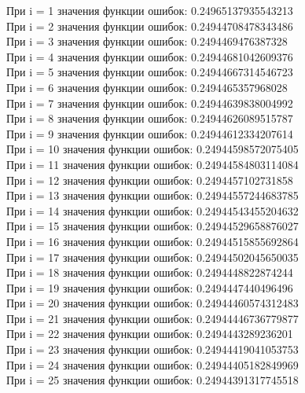 \documentclass[bachelor, och, otchet]{template}
\begin{document}
        \begin{center}
            При i = 1 значения функции ошибок: 0.24965137935543213\\
            При i = 2 значения функции ошибок: 0.24944708478343486\\
            При i = 3 значения функции ошибок: 0.2494469476387328\\
            При i = 4 значения функции ошибок: 0.24944681042609376\\
            При i = 5 значения функции ошибок: 0.24944667314546723\\
            При i = 6 значения функции ошибок: 0.2494465357968028\\
            При i = 7 значения функции ошибок: 0.24944639838004992\\
            При i = 8 значения функции ошибок: 0.24944626089515787\\
            При i = 9 значения функции ошибок: 0.24944612334207614\\
            При i = 10 значения функции ошибок: 0.24944598572075405\\
            При i = 11 значения функции ошибок: 0.24944584803114084\\
            При i = 12 значения функции ошибок: 0.2494457102731858\\
            При i = 13 значения функции ошибок: 0.24944557244683785\\
            При i = 14 значения функции ошибок: 0.24944543455204632\\
            При i = 15 значения функции ошибок: 0.24944529658876027\\
            При i = 16 значения функции ошибок: 0.24944515855692864\\
            При i = 17 значения функции ошибок: 0.24944502045650035\\
            При i = 18 значения функции ошибок: 0.2494448822874244\\
            При i = 19 значения функции ошибок: 0.2494447440496496\\
            При i = 20 значения функции ошибок: 0.24944460574312483\\
            При i = 21 значения функции ошибок: 0.24944446736779877\\
            При i = 22 значения функции ошибок: 0.2494443289236201\\
            При i = 23 значения функции ошибок: 0.24944419041053753\\
            При i = 24 значения функции ошибок: 0.24944405182849969\\
            При i = 25 значения функции ошибок: 0.24944391317745518 \\  
        \end{center}
\end{document}
